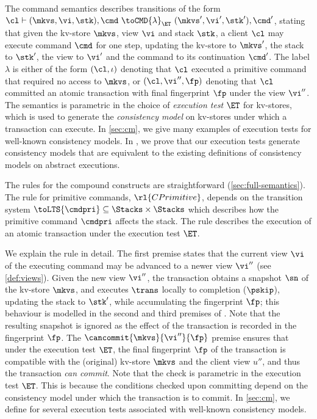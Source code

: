 %
The command semantics describes transitions of the form
\(\cl \vdash (\mkvs, \vi, \stk), \cmd \ \toCMD{\lambda}_{\ET} \ (\mkvs', \vi', \stk'), \cmd'\),
stating that given the kv-store \(\mkvs\), view \(\vi\) and stack \(\stk\), 
a client \(\cl\) may execute command \(\cmd\) for one step, updating 
the kv-store to \(\mkvs'\), the stack to \(\stk'\), the view to \( \vi' \) and the command to its continuation \(\cmd'\).
The label \(\lambda\) is either of the form \((\cl, \iota)\) denoting that \(\cl\) executed a primitive command
that required no access to \(\mkvs\), 
or \((\cl, \vi'', \fp)\) denoting that \(\cl\) committed an atomic transaction with final fingerprint \(\fp\) under the view \(\vi''\).
The semantics is parametric in the choice of \emph{execution test}
\(\ET\) for kv-stores, which is used to generate 
the \emph{consistency model} on kv-stores
under which a 
transaction can execute.
In \cref{sec:cm}, we give many examples of execution tests for
well-known consistency models.
In \cite{shale-phd}, we prove that our execution tests 
generate consistency models that are equivalent to the existing definitions of
consistency models on abstract executions. 

The rules for the compound constructs are straightforward (\cref{sec:full-semantics}).
The rule for primitive commands, \(\rl{CPrimitive}\), 
depends on the 
transition system \(\toLTS{\cmdpri} \subseteq \Stacks \times \Stacks\) 
which describes how the primitive command \(\cmdpri\) affects the stack.
The rule   describes the execution of an atomic 
transaction under the execution test \(\ET\). 


We explain the  rule in detail. 
The first premise 
states that the current view \(\vi\) of the executing command may be advanced to a newer  view \(\vi''\) (see \cref{def:views}). 
Given the new view \(\vi''\), the transaction obtains a snapshot \(\sn\) of the kv-store \(\mkvs\), 
and executes \(\trans\) locally to completion (\(\pskip\)), updating the stack to \(\stk'\), while accumulating the fingerprint \(\fp\); 
this behaviour  is modelled in the second and third premises of .
Note that the resulting snapshot is ignored 
as the effect of the transaction is recorded in the fingerprint \(\fp\). 
The \(\cancommit{\mkvs}{\vi''}{\fp}\) premise ensures that under the execution test \(\ET\), 
the final fingerprint \(\fp\) of the transaction is compatible with the (original) kv-store
\(\mkvs\) and the client view \(u''\), and thus the transaction \emph{can commit}. 
Note that the \cancommitname check is parametric in the execution test \(\ET\).
This is because the conditions checked upon committing depend on the consistency model under which the transaction is to commit. 
In \cref{sec:cm}, we define \cancommitname for several execution tests associated with well-known consistency models.


